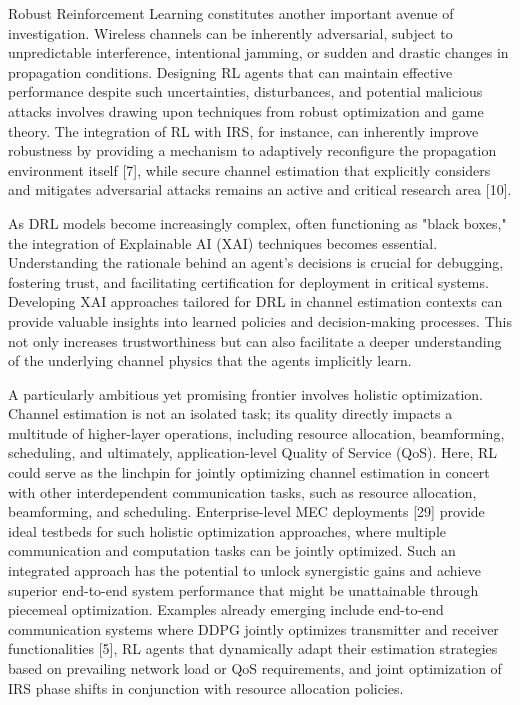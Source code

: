 \documentclass[journal,twocolumn]{IEEEtran}
\begin{document}
Robust Reinforcement Learning constitutes another important avenue of investigation. Wireless channels can be inherently adversarial, subject to unpredictable interference, intentional jamming, or sudden and drastic changes in propagation conditions. Designing RL agents that can maintain effective performance despite such uncertainties, disturbances, and potential malicious attacks involves drawing upon techniques from robust optimization and game theory. The integration of RL with IRS, for instance, can inherently improve robustness by providing a mechanism to adaptively reconfigure the propagation environment itself [7], while secure channel estimation that explicitly considers and mitigates adversarial attacks remains an active and critical research area [10].

As DRL models become increasingly complex, often functioning as "black boxes," the integration of Explainable AI (XAI) techniques becomes essential. Understanding the rationale behind an agent's decisions is crucial for debugging, fostering trust, and facilitating certification for deployment in critical systems. Developing XAI approaches tailored for DRL in channel estimation contexts can provide valuable insights into learned policies and decision-making processes. This not only increases trustworthiness but can also facilitate a deeper understanding of the underlying channel physics that the agents implicitly learn.

A particularly ambitious yet promising frontier involves holistic optimization. Channel estimation is not an isolated task; its quality directly impacts a multitude of higher-layer operations, including resource allocation, beamforming, scheduling, and ultimately, application-level Quality of Service (QoS). Here, RL could serve as the linchpin for jointly optimizing channel estimation in concert with other interdependent communication tasks, such as resource allocation, beamforming, and scheduling. Enterprise-level MEC deployments [29] provide ideal testbeds for such holistic optimization approaches, where multiple communication and computation tasks can be jointly optimized. Such an integrated approach has the potential to unlock synergistic gains and achieve superior end-to-end system performance that might be unattainable through piecemeal optimization. Examples already emerging include end-to-end communication systems where DDPG jointly optimizes transmitter and receiver functionalities [5], RL agents that dynamically adapt their estimation strategies based on prevailing network load or QoS requirements, and joint optimization of IRS phase shifts in conjunction with resource allocation policies.
\end{document}
